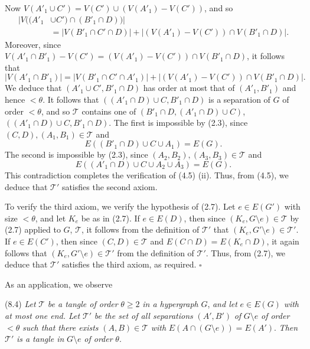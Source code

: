 Now $V(A'_1 \cup C') = V(C') \cup (V(A'_1) - V(C'))$, and so
\begin{align*}
|V((A'_1 &\cup C') \cap (B'_1 \cap D))| \\
&= |V(B'_1 \cap C' \cap D)| + |(V(A'_1) - V(C')) \cap V(B'_1 \cap D)|.
\end{align*}
Moreover, since $V(A'_1 \cap B'_1) - V(C') = (V(A'_1) - V(C')) \cap V(B'_1 \cap D)$, it follows that
\begin{equation*}
|V(A'_1 \cap B'_1)| = |V(B'_1 \cap C' \cap A'_1)| + |(V(A'_1) - V(C')) \cap V(B'_1 \cap D)|.
\end{equation*}
We deduce that $(A'_1 \cup C', B'_1 \cap D)$ has order at most that of $(A'_1, B'_1)$ and hence $<\theta$. It follows that $((A'_1 \cap D) \cup C, B'_1 \cap D)$ is a separation of $G$ of order $<\theta$, and so $\mathscr{T}$ contains one of $(B'_1 \cap D, (A'_1 \cap D) \cup C)$, $((A'_1 \cap D) \cup C, B'_1 \cap D)$. The first is impossible by (2.3), since $(C, D), (A_1, B_1) \in \mathscr{T}$ and
\begin{equation*}
E((B'_1 \cap D) \cup C \cup A_1) = E(G).
\end{equation*}
The second is impossible by (2.3), since $(A_2, B_2), (A_3, B_3) \in \mathscr{T}$ and
\begin{equation*}
E((A'_1 \cap D) \cup C \cup A_2 \cup A_3) = E(G).
\end{equation*}
This contradiction completes the verification of (4.5) (ii). Thus, from (4.5), we deduce that $\mathscr{T}'$ satisfies the second axiom.

To verify the third axiom, we verify the hypothesis of (2.7). Let $e \in E(G')$ with size $<\theta$, and let $K_e$ be as in (2.7). If $e \in E(D)$, then since $(K_e, G \setminus e) \in \mathscr{T}$ by (2.7) applied to $G$, $\mathscr{T}$, it follows from the definition of $\mathscr{T}'$ that $(K_e, G' \setminus e) \in \mathscr{T}'$. If $e \in E(C')$, then since $(C, D) \in \mathscr{T}$ and $E(C \cap D) = E(K_e \cap D)$, it again follows that $(K_e, G' \setminus e) \in \mathscr{T}'$ from the definition of $\mathscr{T}'$. Thus, from (2.7), we deduce that $\mathscr{T}'$ satisfies the third axiom, as required. $\square$

As an application, we observe

\stmt
(8.4) \textit{Let} $\mathscr{T}$ \textit{be a tangle of order} $\theta \ge 2$ \textit{in a hypergraph} $G$, \textit{and let} $e \in E(G)$ \textit{with at most one end. Let} $\mathscr{T}'$ \textit{be the set of all separations} $(A', B')$ \textit{of} $G \setminus e$ \textit{of order} $<\theta$ \textit{such that there exists} $(A, B) \in \mathscr{T}$ \textit{with} $E(A \cap (G \setminus e)) = E(A')$. \textit{Then} $\mathscr{T}'$ \textit{is a tangle in} $G \setminus e$ \textit{of order} $\theta$.

